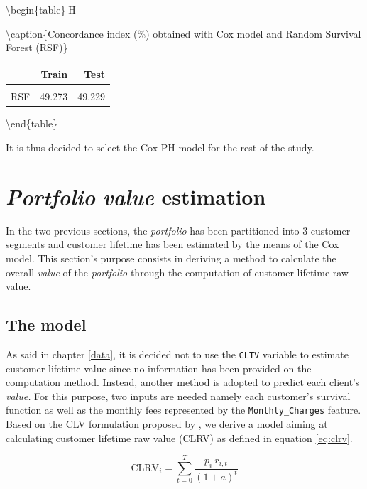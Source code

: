 \documentclass[
]{book}
\begin{document}
\textbackslash begin\{table\}{[}H{]}

\textbackslash caption\{\label{tab:performances}Concordance index (\%) obtained with Cox model and Random Survival Forest (RSF)\}
\centering

\begin{tabular}[t]{lrr}
\toprule
  & Train & Test\\
\midrule
\cellcolor{gray!6}{Cox} & \cellcolor{gray!6}{86.769} & \cellcolor{gray!6}{86.253}\\
RSF & 49.273 & 49.229\\
\bottomrule
\end{tabular}

\textbackslash end\{table\}

It is thus decided to select the Cox PH model for the rest of the study.

\hypertarget{portfoliovalue}{%
\section{\texorpdfstring{\emph{Portfolio} \emph{value} estimation}{Portfolio value estimation}}\label{portfoliovalue}}

In the two previous sections, the \emph{portfolio} has been partitioned into 3 customer segments and customer lifetime has been estimated by the means of the Cox model. This section's purpose consists in deriving a method to calculate the overall \emph{value} of the \emph{portfolio} through the computation of customer lifetime raw value.

\hypertarget{the-model}{%
\subsection{The model}\label{the-model}}

As said in chapter \ref{data}, it is decided not to use the \texttt{CLTV} variable to estimate customer lifetime value since no information has been provided on the computation method. Instead, another method is adopted to predict each client's \emph{value.} For this purpose, two inputs are needed namely each customer's survival function as well as the monthly fees represented by the \texttt{Monthly\_Charges} feature. Based on the CLV formulation proposed by \citet{CUSTOMERS_ASSETS}, we derive a model aiming at calculating customer lifetime raw value (CLRV) as defined in equation \eqref{eq:clrv}.

\begin{equation}
    \text{CLRV}_i = \sum_{t=0}^{T} \frac{p_i \ r_{i,t}}{(1+a)^t} 
    \label{eq:clrv}
\end{equation}
\end{document}
